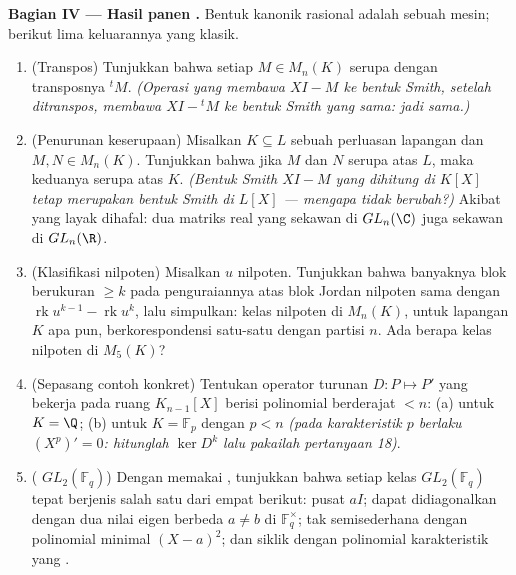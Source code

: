 \begin{problem}
\medskip
\noindent\textbf{Bagian IV --- Hasil panen .} Bentuk kanonik rasional adalah sebuah mesin; berikut
lima keluarannya yang klasik.
\begin{enumerate}[resume]
  \item (Transpos) Tunjukkan bahwa setiap $M \in M_n(K)$ serupa dengan
        transposnya ${}^tM$. \emph{(Operasi yang membawa
        $XI - M$ ke bentuk Smith, setelah ditranspos, membawa $XI - {}^tM$ ke
        bentuk Smith yang sama: jadi  sama.)}
  \item (Penurunan keserupaan) Misalkan $K \subseteq L$ sebuah perluasan
        lapangan dan $M, N \in M_n(K)$. Tunjukkan bahwa jika $M$ dan $N$
        serupa atas $L$, maka keduanya serupa atas $K$.
        \emph{(Bentuk Smith $XI - M$ yang dihitung di $K[X]$
        tetap merupakan bentuk Smith di $L[X]$ --- mengapa 
        tidak berubah?)} Akibat yang layak dihafal: dua matriks
        real yang sekawan di $GL_n(\C)$ juga sekawan di
        $GL_n(\R)$.
  \item (Klasifikasi nilpoten) Misalkan $u$ nilpoten. Tunjukkan
        bahwa banyaknya blok berukuran $\geq k$ pada
        penguraiannya atas blok Jordan nilpoten sama dengan
        $\operatorname{rk}u^{k-1} - \operatorname{rk}u^k$, lalu
        simpulkan: kelas nilpoten di $M_n(K)$, untuk lapangan $K$ apa pun,
        berkorespondensi satu-satu dengan partisi $n$. Ada berapa
        kelas nilpoten di $M_5(K)$?
  \item (Sepasang contoh konkret) Tentukan 
        operator turunan $D\colon P \mapsto P'$ yang bekerja pada ruang
        $K_{n-1}[X]$ berisi polinomial berderajat $< n$: (a) untuk $K =
        \Q$; (b) untuk $K = \mathbb F_p$ dengan $p < n$
        \emph{(pada karakteristik $p$ berlaku $(X^p)' = 0$: hitunglah
        $\ker D^k$ lalu pakailah pertanyaan 18)}.
  \item ( $GL_2(\mathbb F_q)$) Dengan memakai
        , tunjukkan bahwa setiap kelas
        $GL_2(\mathbb F_q)$ tepat berjenis salah satu dari empat berikut:
        pusat $aI$; dapat didiagonalkan dengan dua nilai eigen
        berbeda $a \neq b$ di $\mathbb F_q^\times$;
        tak semisederhana dengan polinomial minimal $(X - a)^2$;
        dan siklik dengan polinomial karakteristik yang .

\end{enumerate}
\end{problem}
